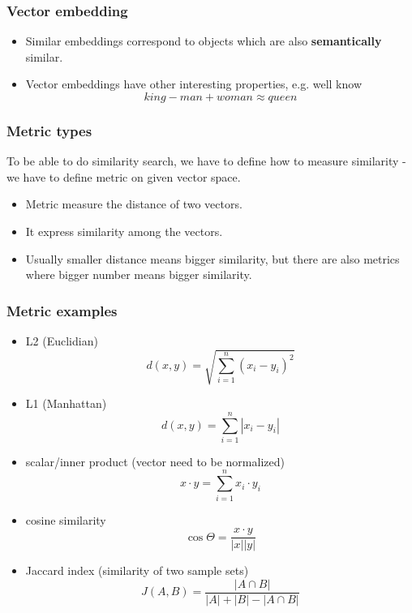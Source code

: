 \documentclass[10pt,utf8]{beamer}
\begin{document}
\begin{frame}
    \frametitle{Vector embedding}
    \begin{itemize}
        \item Similar embeddings correspond to objects which are also \textbf{semantically} similar.
        \item Vector embeddings have other interesting properties, e.g. well know 
        \begin{equation}
            king - man + woman \approx queen
        \end{equation}
    \end{itemize}
\end{frame}

\begin{frame}
    \frametitle{Metric types}
    To be able to do similarity search, we have to define how to measure similarity - we have to define metric on given vector space.
    
    \vspace{0.1cm}
    
    \begin{itemize}
        \item Metric measure the distance of two vectors.
        \item It express similarity among the vectors.
        \item Usually smaller distance means bigger similarity, but there are also metrics where bigger number means bigger similarity.
    \end{itemize}
\end{frame}

\begin{frame}
    \frametitle{Metric examples}
    \begin{itemize}
        \item L2 (Euclidian) $$d(x,y) = \sqrt{\sum_{i=1}^{n} (x_i - y_i)^2}$$
        \item L1 (Manhattan) $$d(x,y) = \sum_{i=1}^{n} |x_i - y_i|$$
        \item scalar/inner product (vector need to be normalized) $$x \cdot y = \sum_{i=1}^{n} x_i \cdot y_i$$
        \item cosine similarity $$\cos{\Theta} = \frac{x \cdot y}{|x||y|}$$
        \item Jaccard index (similarity of two sample sets) $$J(A, B) = \frac{|A \cap B|}{|A| + |B| - |A \cap B|}$$
    \end{itemize}
\end{frame}
\end{document}
